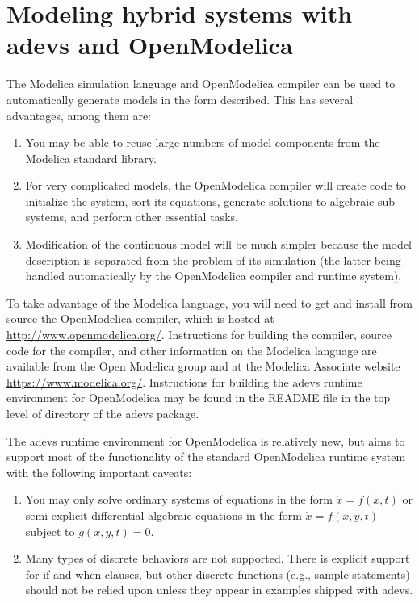 \section{Modeling hybrid systems with adevs and OpenModelica}
The Modelica simulation language and OpenModelica compiler can be used to automatically generate models in the form described. This has several advantages, among them are:
\begin{enumerate}
\item You may be able to reuse large numbers of model components from the Modelica standard library.
\item For very complicated models, the OpenModelica compiler will create code to initialize the system, sort its equations, generate solutions to algebraic sub-systems, and perform other essential tasks.
\item Modification of the continuous model will be much simpler because the model description is separated from the problem of its simulation (the latter being handled automatically by the OpenModelica compiler and runtime system).
\end{enumerate}

To take advantage of the Modelica language, you will need to get and install from source the OpenModelica compiler, which is hosted at \url{http://www.openmodelica.org/}. Instructions for building the compiler, source code for the compiler, and other information on the Modelica language are available from the Open Modelica group and at the Modelica Associate website \url{https://www.modelica.org/}. Instructions for building the adevs runtime environment for OpenModelica may be found in the README file in the top level of directory of the adevs package.

The adevs runtime environment for OpenModelica is relatively new, but aims to support most of the functionality of the standard OpenModelica runtime system with the following important caveats:
\begin{enumerate}
\item You may only solve ordinary systems of equations in the form $\dot{x}=f(x,t)$ or semi-explicit differential-algebraic equations in the form $\dot{x}=f(x,y,t)$ subject to $g(x,y,t)=0$.
\item Many types of discrete behaviors are not supported. There is explicit support for if and when clauses, but other discrete functions (e.g., sample statements) should not be relied upon unless they appear in examples shipped with adevs.
\end{enumerate}

